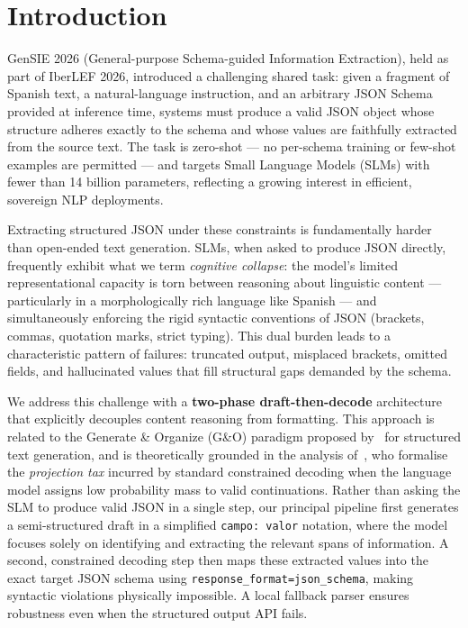 \documentclass[onecolumn]{ceurart}
\begin{document}
\maketitle


\section{Introduction}
\label{sec:introduction}

GenSIE 2026 (General-purpose Schema-guided Information Extraction), held as
part of IberLEF 2026, introduced a challenging shared task: given a fragment of
Spanish text, a natural-language instruction, and an arbitrary JSON Schema
provided at inference time, systems must produce a valid JSON object whose
structure adheres exactly to the schema and whose values are faithfully
extracted from the source text. The task is zero-shot --- no per-schema training
or few-shot examples are permitted --- and targets Small Language Models (SLMs)
with fewer than 14 billion parameters, reflecting a growing interest in
efficient, sovereign NLP deployments.

Extracting structured JSON under these constraints is fundamentally harder than
open-ended text generation. SLMs, when asked to produce JSON directly,
frequently exhibit what we term \emph{cognitive collapse}: the model's limited
representational capacity is torn between reasoning about linguistic
content --- particularly in a morphologically rich language like Spanish --- and
simultaneously enforcing the rigid syntactic conventions of JSON (brackets,
commas, quotation marks, strict typing). This dual burden leads to a
characteristic pattern of failures: truncated output, misplaced brackets,
omitted fields, and hallucinated values that fill structural gaps demanded by
the schema.

We address this challenge with a \textbf{two-phase draft-then-decode}
architecture that explicitly decouples content reasoning from formatting. This
approach is related to the Generate \& Organize (G\&O) paradigm proposed
by~\citet{li2024generate} for structured text generation, and is theoretically
grounded in the analysis of~\citet{reddy2026dccd}, who formalise the
\emph{projection tax} incurred by standard constrained decoding when the
language model assigns low probability mass to valid continuations. Rather than
asking the SLM to produce valid JSON in a single step, our principal pipeline
first generates a semi-structured draft in a simplified \texttt{campo: valor}
notation, where the model focuses solely on identifying and extracting the
relevant spans of information. A second, constrained decoding step then maps
these extracted values into the exact target JSON schema using
\texttt{response\_format=json\_schema}, making syntactic violations physically
impossible. A local fallback parser ensures robustness even when the structured
output API fails.
\end{document}

